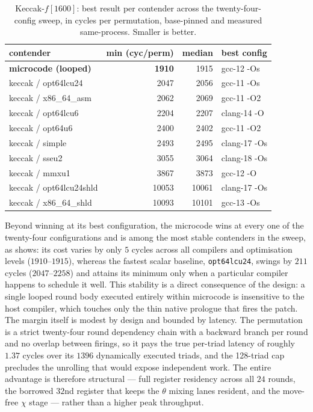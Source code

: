 \begin{table}[t]
\centering
\caption{Keccak-$f[1600]$: best result per contender across the
twenty-four-config sweep, in cycles per permutation, base-pinned and measured
same-process. Smaller is better.}
\label{tab:res-keccak-best}
\small
\begin{tabular}{@{}lrrl@{}}
\toprule
contender & min (cyc/perm) & median & best config \\
\midrule
\textbf{microcode (looped)} & \textbf{1910} & 1915  & gcc-12 -Os \\
keccak / opt64lcu24         & 2047          & 2056  & gcc-11 -Os \\
keccak / x86\_64\_asm       & 2062          & 2069  & gcc-11 -O2 \\
keccak / opt64lcu6          & 2204          & 2207  & clang-14 -O \\
keccak / opt64u6            & 2400          & 2402  & gcc-11 -O2 \\
keccak / simple             & 2493          & 2495  & clang-17 -Os \\
keccak / sseu2              & 3055          & 3064  & clang-18 -Os \\
keccak / mmxu1              & 3867          & 3873  & gcc-12 -O \\
keccak / opt64lcu24shld     & 10053         & 10061 & clang-17 -Os \\
keccak / x86\_64\_shld      & 10093         & 10101 & gcc-13 -Os \\
\bottomrule
\end{tabular}
\end{table}

Beyond winning at its best configuration, the microcode wins at every one of the
twenty-four configurations and is among the most stable contenders in the sweep,
as  shows: its cost varies by only $5$ cycles
across all compilers and optimisation levels ($1910$--$1915$), whereas the fastest
scalar baseline, \texttt{opt64lcu24}, swings by $211$ cycles ($2047$--$2258$) and
attains its minimum only when a particular compiler happens to schedule it well.
This stability is a direct consequence of the design: a single looped round body
executed entirely within microcode is insensitive to the host compiler, which
touches only the thin native prologue that fires the patch. The margin itself is
modest by design and bounded by latency. The permutation is a strict twenty-four
round dependency chain with a backward branch per round and no overlap between
firings, so it pays the true per-triad latency of roughly $1.37$ cycles over its
$1396$ dynamically executed triads, and the 128-triad cap precludes the unrolling
that would expose independent work. The entire advantage is therefore structural
--- full register residency across all $24$ rounds, the borrowed $32$nd register
that keeps the $\theta$ mixing lanes resident, and the move-free $\chi$ stage ---
rather than a higher peak throughput.

